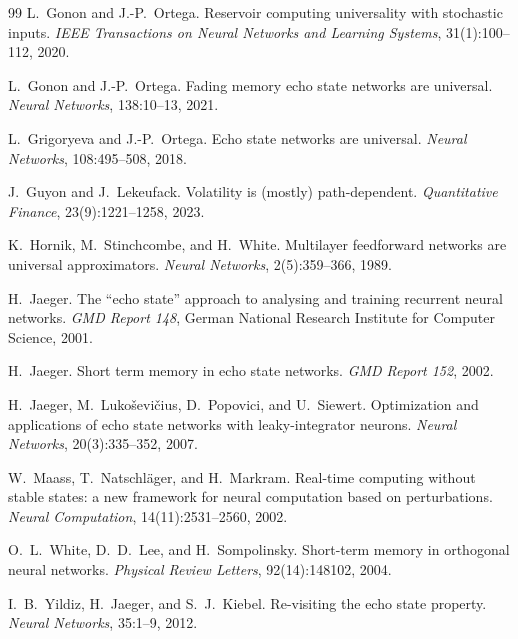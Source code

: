 \documentclass[11pt]{article}
\theoremstyle{definition}
\theoremstyle{plain}
\begin{document}
\begin{thebibliography}{99}
 L.\ Gonon and J.-P.\ Ortega. Reservoir computing universality with stochastic inputs. \emph{IEEE Transactions on Neural Networks and Learning Systems}, 31(1):100--112, 2020.

 L.\ Gonon and J.-P.\ Ortega. Fading memory echo state networks are universal. \emph{Neural Networks}, 138:10--13, 2021.

 L.\ Grigoryeva and J.-P.\ Ortega. Echo state networks are universal. \emph{Neural Networks}, 108:495--508, 2018.

 J.\ Guyon and J.\ Lekeufack. Volatility is (mostly) path-dependent. \emph{Quantitative Finance}, 23(9):1221--1258, 2023.

 K.\ Hornik, M.\ Stinchcombe, and H.\ White. Multilayer feedforward networks are universal approximators. \emph{Neural Networks}, 2(5):359--366, 1989.

 H.\ Jaeger. The ``echo state'' approach to analysing and training recurrent neural networks. \emph{GMD Report 148}, German National Research Institute for Computer Science, 2001.

 H.\ Jaeger. Short term memory in echo state networks. \emph{GMD Report 152}, 2002.

 H.\ Jaeger, M.\ Luko\v{s}evi\v{c}ius, D.\ Popovici, and U.\ Siewert. Optimization and applications of echo state networks with leaky-integrator neurons. \emph{Neural Networks}, 20(3):335--352, 2007.

 W.\ Maass, T.\ Natschl\"ager, and H.\ Markram. Real-time computing without stable states: a new framework for neural computation based on perturbations. \emph{Neural Computation}, 14(11):2531--2560, 2002.

 O.\ L.\ White, D.\ D.\ Lee, and H.\ Sompolinsky. Short-term memory in orthogonal neural networks. \emph{Physical Review Letters}, 92(14):148102, 2004.

 I.\ B.\ Yildiz, H.\ Jaeger, and S.\ J.\ Kiebel. Re-visiting the echo state property. \emph{Neural Networks}, 35:1--9, 2012.

\end{thebibliography}
\end{document}
